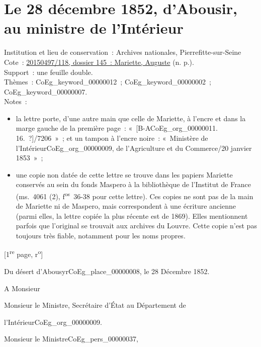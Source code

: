 \documentclass{book}
\begin{document}
\section*{Le 28 décembre 1852, d’Abousir, au ministre de l'Intérieur}  
{\footnotesize
\noindent Institution et lieu de conservation~: Archives nationales, Pierrefitte-sur-Seine\\
Cote~: \hyperlink{CoEg_Mariette_ms_001}{20150497/118, dossier 145~: Mariette, Auguste} (n. p.).\\
Support~: une feuille double.\\
Thèmes~: \gls{CoEg_keyword_00000012}~; \gls{CoEg_keyword_00000002}~; \gls{CoEg_keyword_00000007}.\\
Notes~: \begin{itemize} \item la lettre porte, d’une autre main que celle de Mariette, à l’encre et dans la marge gauche de la première page~: «~[B-A\gls{CoEg_org_00000011}. 16.~?]/7206~»~; et un tampon à l’encre noire~: «~Ministère de l’Intérieur\gls{CoEg_org_00000009}, de l’Agriculture et du Commerce/20 janvier 1853~»~; \item une copie non datée de cette lettre se trouve dans les papiers Mariette conservés au sein du fonds Maspero à la bibliothèque de l’Institut de France (ms.~4061 (2), f\textsuperscript{os}~36-38 pour cette lettre). Ces copies ne sont pas de la main de Mariette ni de Maspero, mais correspondent à une écriture ancienne (parmi elles, la lettre copiée la plus récente est de 1869). Elles mentionnent parfois que l’original se trouvait aux archives du Louvre. Cette copie n’est pas toujours très fiable, notamment pour les noms propres.\end{itemize}
\begin{center} {[1\textsuperscript{re} page, r\textsuperscript{o}]}\end{center}}
\begin{flushright} Du désert d’Abousyr\gls{CoEg_place_00000008}, le 28 Décembre 1852.\end{flushright}
\indent A Monsieur
\begin{center}Monsieur le Ministre, Secrétaire d’État au Département de\end{center}
\begin{flushright}l’Intérieur\gls{CoEg_org_00000009}.\end{flushright}

\hspace{1cm} Monsieur le Ministre\gls{CoEg_pers_00000037},\\
\end{document}

